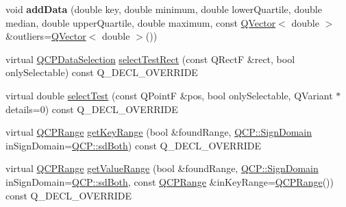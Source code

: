 \begin{DoxyCompactItemize}
void {\bfseries add\+Data} (double key, double minimum, double lower\+Quartile, double median, double upper\+Quartile, double maximum, const \hyperlink{class_q_vector}{Q\+Vector}$<$ double $>$ \&outliers=\hyperlink{class_q_vector}{Q\+Vector}$<$ double $>$())
\item 
virtual \hyperlink{class_q_c_p_data_selection}{Q\+C\+P\+Data\+Selection} \hyperlink{class_q_c_p_statistical_box_a7047863d59673d8d049bf26cfdd9912c}{select\+Test\+Rect} (const Q\+RectF \&rect, bool only\+Selectable) const Q\+\_\+\+D\+E\+C\+L\+\_\+\+O\+V\+E\+R\+R\+I\+DE
\item 
virtual double \hyperlink{class_q_c_p_statistical_box_ae78bfe096f463a8d08464c20cc25defe}{select\+Test} (const Q\+PointF \&pos, bool only\+Selectable, Q\+Variant $\ast$details=0) const Q\+\_\+\+D\+E\+C\+L\+\_\+\+O\+V\+E\+R\+R\+I\+DE
\item 
virtual \hyperlink{class_q_c_p_range}{Q\+C\+P\+Range} \hyperlink{class_q_c_p_statistical_box_ae44dd2e135ebf2a53eb6e4bfe7343211}{get\+Key\+Range} (bool \&found\+Range, \hyperlink{namespace_q_c_p_afd50e7cf431af385614987d8553ff8a9}{Q\+C\+P\+::\+Sign\+Domain} in\+Sign\+Domain=\hyperlink{namespace_q_c_p_afd50e7cf431af385614987d8553ff8a9a3dee7e9cd2fedce9253b83e172626a6c}{Q\+C\+P\+::sd\+Both}) const Q\+\_\+\+D\+E\+C\+L\+\_\+\+O\+V\+E\+R\+R\+I\+DE
\item 
virtual \hyperlink{class_q_c_p_range}{Q\+C\+P\+Range} \hyperlink{class_q_c_p_statistical_box_a377e0cd27c7301949778c3f27620bf89}{get\+Value\+Range} (bool \&found\+Range, \hyperlink{namespace_q_c_p_afd50e7cf431af385614987d8553ff8a9}{Q\+C\+P\+::\+Sign\+Domain} in\+Sign\+Domain=\hyperlink{namespace_q_c_p_afd50e7cf431af385614987d8553ff8a9a3dee7e9cd2fedce9253b83e172626a6c}{Q\+C\+P\+::sd\+Both}, const \hyperlink{class_q_c_p_range}{Q\+C\+P\+Range} \&in\+Key\+Range=\hyperlink{class_q_c_p_range}{Q\+C\+P\+Range}()) const Q\+\_\+\+D\+E\+C\+L\+\_\+\+O\+V\+E\+R\+R\+I\+DE
\end{DoxyCompactItemize}
